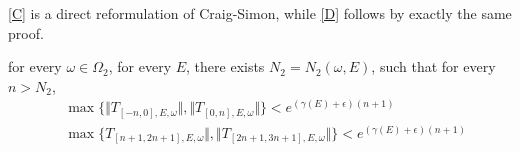 \begin{remark}
  \eqref{C} is a direct reformulation of Craig-Simon, while \eqref{D} follows by exactly the same proof.
\end{remark}
\begin{cor}\label{omega2}
  for every $ \omega\in\Omega_2$, for every $E$, there exists $N_2=N_2(\omega,E)$, such that for every $ n>N_2$,
\[
\begin{aligned}
&\max\{\Vert T_{[-n,0],E,\omega}\Vert, \Vert T_{[0,n],E,\omega}\Vert\}<e^{(\gamma(E)+\epsilon)(n+1)}\\ &\max\{T_{[n+1,2n+1],E,\omega}\Vert, \Vert T_{[2n+1,3n+1],E,\omega}\Vert\}<e^{(\gamma(E)+\epsilon)(n+1)}
\end{aligned}
\]

\end{cor}
